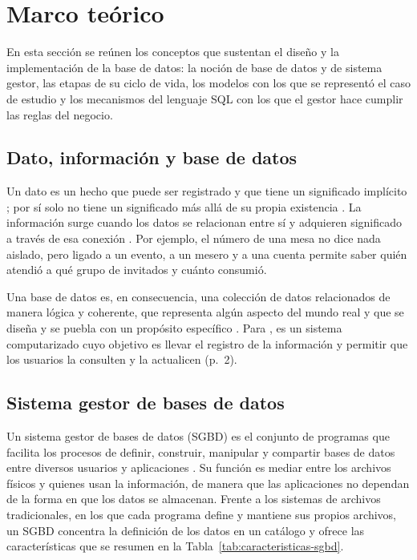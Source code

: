 \newpage

\section{Marco teórico}
\label{sec:marco-teorico}

En esta sección se reúnen los conceptos que sustentan el diseño y la implementación de la base de datos: la noción de base de datos y de sistema gestor, las etapas de su ciclo de vida, los modelos con los que se representó el caso de estudio y los mecanismos del lenguaje SQL con los que el gestor hace cumplir las reglas del negocio.

\subsection{Dato, información y base de datos}

Un dato es un hecho que puede ser registrado y que tiene un significado implícito \parencite[p.~4]{elmasri_navathe}; por sí solo no tiene un significado más allá de su propia existencia \parencite[p.~1]{bellinger_dikw}. La información surge cuando los datos se relacionan entre sí y adquieren significado a través de esa conexión \parencite[p.~1]{bellinger_dikw}. Por ejemplo, el número de una mesa no dice nada aislado, pero ligado a un evento, a un mesero y a una cuenta permite saber quién atendió a qué grupo de invitados y cuánto consumió.

Una base de datos es, en consecuencia, una colección de datos relacionados de manera lógica y coherente, que representa algún aspecto del mundo real y que se diseña y se puebla con un propósito específico \parencite[p.~5]{elmasri_navathe}. Para \textcite{date_intro_bd}, es un sistema computarizado cuyo objetivo es llevar el registro de la información y permitir que los usuarios la consulten y la actualicen (p.~2).

\subsection{Sistema gestor de bases de datos}

Un sistema gestor de bases de datos (SGBD) es el conjunto de programas que facilita los procesos de definir, construir, manipular y compartir bases de datos entre diversos usuarios y aplicaciones \parencite[p.~6]{elmasri_navathe}. Su función es mediar entre los archivos físicos y quienes usan la información, de manera que las aplicaciones no dependan de la forma en que los datos se almacenan. Frente a los sistemas de archivos tradicionales, en los que cada programa define y mantiene sus propios archivos, un SGBD concentra la definición de los datos en un catálogo y ofrece las características que se resumen en la Tabla~\ref{tab:caracteristicas-sgbd}.

